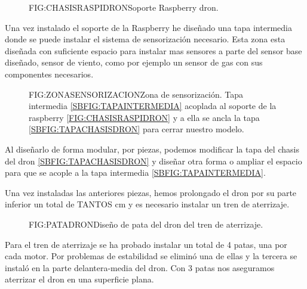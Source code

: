 \begin{description}
\begin{description}
\begin{figure}[Chasis raspberry dron]{FIG:CHASISRASPIDRON}{Soporte Raspberry dron.}
\end{figure}

\item[Zona de sensorización: ]

Una vez instalado el soporte de la Raspberry he diseñado una tapa intermedia donde se puede instalar el sistema de sensorización necesario. Esta zona esta diseñada con suficiente espacio para instalar mas sensores a parte del sensor base diseñado, sensor de viento, como por ejemplo un sensor de gas con sus componentes necesarios.

\begin{figure}[Zona sensorización dron]{FIG:ZONASENSORIZACION}{Zona de sensorización. Tapa intermedia \ref{SBFIG:TAPAINTERMEDIA} acoplada al soporte de la raspberry \ref{FIG:CHASISRASPIDRON} y a ella se ancla la tapa \ref{SBFIG:TAPACHASISDRON} para cerrar nuestro modelo.}
	
   \quad
  
\end{figure} 

Al diseñarlo de forma modular, por piezas, podemos modificar la tapa del chasis del dron \ref{SBFIG:TAPACHASISDRON} y diseñar otra forma o ampliar el espacio para que se acople a la tapa intermedia  \ref{SBFIG:TAPAINTERMEDIA}.

\item[Elementos de aterrizaje]

Una vez instaladas las anteriores piezas, hemos prolongado el dron por su parte inferior un total de TANTOS cm y es necesario instalar un tren de aterrizaje.

\begin{figure}[Pata dron]{FIG:PATADRON}{Diseño de pata del dron del tren de aterrizaje.}
\end{figure}
\end{description}

Para el tren de aterrizaje se ha probado instalar un total de 4 patas, una por cada motor. Por problemas de estabilidad se eliminó una de ellas y la tercera se instaló en la parte delantera-media del dron. Con 3 patas nos aseguramos aterrizar el dron en una superficie plana.


\end{description}
